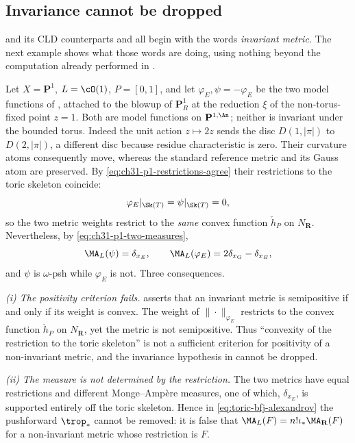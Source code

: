 \subsection{Invariance cannot be dropped}
\label{sec:ch31-toric-invariance}

 and its CLD counterparts
 and  all begin with the
words \emph{invariant metric}.  The next example shows what those words are
doing, using nothing beyond the computation already performed in
.

\begin{example}
\label{ex:ch31-noninvariant}
Let $X=\mathbf P^1$, $L=\cO(1)$, $P=[0,1]$, and let
$\varphi_E,\psi=-\varphi_E$ be the two model functions of
, attached to the blowup of $\mathbf P^1_R$ at the
reduction $\xi$ of the non-torus-fixed point $z=1$.  Both are model
functions on $\mathbf P^{1,\An}$; neither is invariant under the bounded
torus.  Indeed the unit action $z\mapsto2z$ sends the disc
$D(1,|\pi|)$ to $D(2,|\pi|)$, a different disc because residue
characteristic is zero.  Their curvature atoms consequently move,
whereas the standard reference metric and its Gauss atom are preserved.  By
\eqref{eq:ch31-p1-restrictions-agree} their restrictions to the toric
skeleton coincide:
\[
 \varphi_E|_{\Sk(T)}=\psi|_{\Sk(T)}=0,
\]
so the two metric weights restrict to the \emph{same} convex function
$\check h_P$ on $N_\mathbf R$.  Nevertheless, by
\eqref{eq:ch31-p1-two-measures},
\[
 \MA_L(\psi)=\delta_{x_E},
 \qquad
 \MA_L(\varphi_E)=2\delta_{x_{\mathrm G}}-\delta_{x_E},
\]
and $\psi$ is $\omega$-psh while $\varphi_E$ is not.  Three
consequences.

\emph{(i) The positivity criterion fails.}
 asserts that an invariant metric is
semipositive if and only if its weight is convex.  The weight of
$\|\cdot\|_{\varphi_E}$ restricts to the convex function
$\check h_P$ on $N_\mathbf R$, yet the metric is not semipositive.  Thus
``convexity of the restriction to the toric skeleton'' is not a sufficient
criterion for positivity of a non-invariant metric, and the invariance
hypothesis in  cannot be dropped.

\emph{(ii) The measure is not determined by the restriction.}  The two
metrics have equal restrictions and different Monge--Amp\`ere measures, one
of which, $\delta_{x_E}$, is supported entirely off the toric skeleton.
Hence in \eqref{eq:toric-bfj-alexandrov} the pushforward $\trop_*$ cannot
be removed: it is false that $\MA_L(F)=n!\iota_*\MA_{\mathbf R}(F)$ for a
non-invariant metric whose restriction is $F$.


\end{example}

